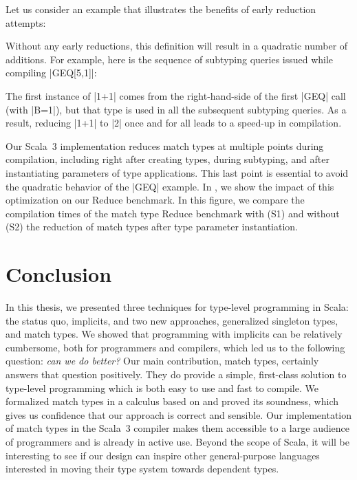 Let us consider an example that illustrates the benefits of early reduction attempts:

\geqDefinition

\noindent
Without any early reductions, this definition will result in a quadratic number of additions. For example, here is the sequence of subtyping queries issued while compiling |GEQ[5,1]|:

\geqExample

\noindent
The first instance of |1+1| comes from the right-hand-side of the first |GEQ| call (with |B=1|), but that type is used in all the subsequent subtyping queries. As a result, reducing |1+1| to |2| once and for all leads to a speed-up in compilation.

Our Scala~3 implementation reduces match types at multiple points during compilation, including right after creating types, during subtyping, and after instantiating parameters of type applications.
This last point is essential to avoid the quadratic behavior of the |GEQ| example.
In , we show the impact of this optimization on our Reduce benchmark.
In this figure, we compare the compilation times of the match type Reduce benchmark with (S1) and without (S2) the reduction of match types after type parameter instantiation.


\chapter{Conclusion}
\label{chap:conclusion}

In this thesis, we presented three techniques for type-level programming in Scala: the status quo, implicits, and two new approaches, generalized singleton types, and match types.
We showed that programming with implicits can be relatively cumbersome, both for programmers and compilers, which led us to the following question: \emph{can we do better?}
Our main contribution, match types, certainly answers that question positively.
They do provide a simple, first-class solution to type-level programming which is both easy to use and fast to compile.
We formalized match types in a calculus based on \SystemFsub and proved its soundness, which gives us confidence that our approach is correct and sensible.
Our implementation of match types in the Scala~3 compiler makes them accessible to a large audience of programmers and is already in active use.
Beyond the scope of Scala, it will be interesting to see if our design can inspire other general-purpose languages interested in moving their type system towards dependent types.

